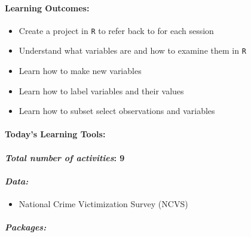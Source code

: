 \documentclass[
]{book}
\providecommand{\tightlist}{%
  \setlength{\itemsep}{0pt}\setlength{\parskip}{0pt}}
\begin{document}
\hypertarget{learning-outcomes-1}{%
\paragraph*{\texorpdfstring{\textbf{Learning Outcomes:}}{Learning Outcomes:}}\label{learning-outcomes-1}}

\begin{itemize}
\tightlist
\item
  Create a project in \texttt{R} to refer back to for each session
\item
  Understand what variables are and how to examine them in \texttt{R}
\item
  Learn how to make new variables
\item
  Learn how to label variables and their values
\item
  Learn how to subset select observations and variables
\end{itemize}

\hypertarget{todays-learning-tools-1}{%
\paragraph*{\texorpdfstring{\textbf{Today's Learning Tools:}}{Today's Learning Tools:}}\label{todays-learning-tools-1}}

\hypertarget{total-number-of-activities-9}{%
\paragraph*{\texorpdfstring{\emph{Total number of activities}: 9}{Total number of activities: 9}}\label{total-number-of-activities-9}}

\hypertarget{data-1}{%
\paragraph*{\texorpdfstring{\emph{Data:}}{Data:}}\label{data-1}}

\begin{itemize}
\tightlist
\item
  National Crime Victimization Survey (NCVS)
\end{itemize}

\hypertarget{packages-2}{%
\paragraph*{\texorpdfstring{\emph{Packages:}}{Packages:}}\label{packages-2}}
\end{document}

